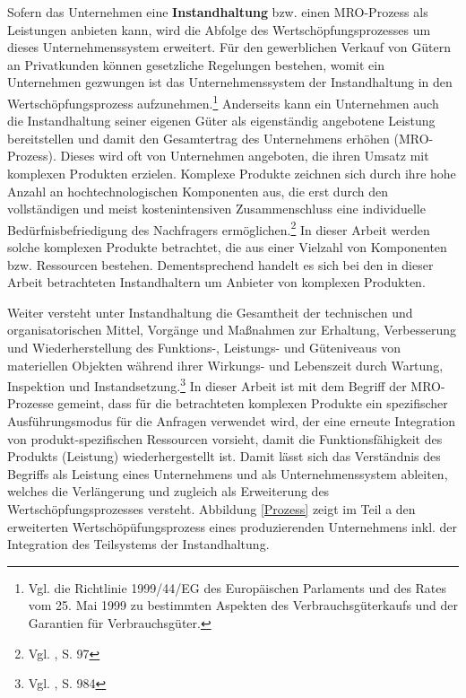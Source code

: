 Sofern das Unternehmen eine \textbf{Instandhaltung} bzw. einen MRO-Prozess als Leistungen anbieten kann, wird die Abfolge des Wertschöpfungsprozesses um dieses Unternehmenssystem erweitert. Für den gewerblichen Verkauf von Gütern an Privatkunden können gesetzliche Regelungen bestehen, womit ein Unternehmen gezwungen ist das Unternehmenssystem der Instandhaltung in den Wertschöpfungsprozess aufzunehmen.\footnote{Vgl. die Richtlinie 1999/44/EG des Europäischen Parlaments und des Rates vom 25. Mai 1999 zu bestimmten Aspekten des Verbrauchsgüterkaufs und der Garantien für Verbrauchsgüter.} Anderseits kann ein Unternehmen auch die Instandhaltung seiner eigenen Güter als eigenständig angebotene Leistung bereitstellen und damit den Gesamtertrag des Unternehmens erhöhen (MRO-Prozess). Dieses wird oft von Unternehmen angeboten, die ihren Umsatz mit komplexen Produkten erzielen. Komplexe Produkte zeichnen sich durch ihre hohe Anzahl an hochtechnologischen Komponenten aus, die erst durch den vollständigen und meist kostenintensiven Zusammenschluss eine individuelle Bedürfnisbefriedigung des Nachfragers ermöglichen.\footnote{Vgl. \cite{komplexe2009Schmidt}, S. 97} In dieser Arbeit werden solche komplexen Produkte betrachtet, die aus einer Vielzahl von Komponenten bzw. Ressourcen bestehen. Dementsprechend handelt es sich bei den in dieser Arbeit betrachteten Instandhaltern um Anbieter von komplexen Produkten. 

Weiter versteht \citeauthor{helbing2010instandhaltung} unter Instandhaltung die \glqq Gesamtheit der technischen und organisatorischen Mittel, Vorgänge und Maßnahmen zur Erhaltung, Verbesserung und Wiederherstellung des Funktions-, Leistungs- und Güteniveaus von materiellen Objekten während ihrer Wirkungs- und Lebenszeit durch Wartung, Inspektion und Instandsetzung.\grqq\footnote{Vgl. \citeauthor{helbing2010instandhaltung}, S. 984} In dieser Arbeit ist mit dem Begriff der MRO-Prozesse gemeint, dass für die betrachteten komplexen Produkte ein spezifischer Ausführungsmodus für die Anfragen verwendet wird, der eine erneute Integration von produkt-spezifischen Ressourcen vorsieht, damit die Funktionsfähigkeit des Produkts (Leistung) wiederhergestellt ist. Damit lässt sich das Verständnis des Begriffs als Leistung eines Unternehmens und als Unternehmenssystem ableiten, welches die Verlängerung und zugleich als Erweiterung des Wertschöpfungsprozesses versteht. Abbildung \ref{Prozess} zeigt im Teil a den erweiterten Wertschöpüfungsprozess eines produzierenden Unternehmens inkl. der Integration des Teilsystems der Instandhaltung.

